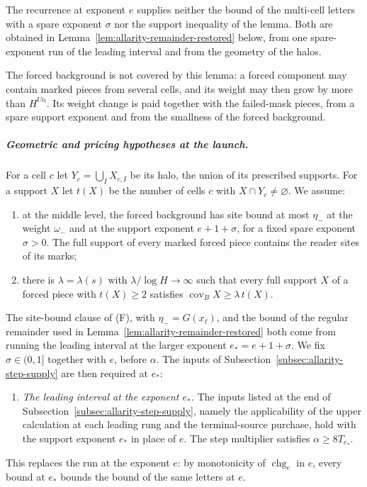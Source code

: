 The recurrence at exponent $e$ supplies neither the bound of the
multi-cell letters with a spare exponent $\sigma$ nor the support
inequality of the lemma. Both are obtained in
Lemma~\ref{lem:allarity-remainder-restored} below, from one spare-exponent
run of the leading interval and from the geometry of the halos.

The forced background is not covered by this lemma: a forced component
may contain marked pieces from several cells, and its weight may then
grow by more than $H^{Un}$. Its weight change is paid together with the
failed-mask pieces, from a spare support exponent and from the smallness
of the forced background.

\subparagraph{Geometric and pricing hypotheses at the launch.}
For a cell $c$ let $Y_c=\bigcup_IX_{c,I}$ be its halo, the union of its
prescribed supports. For a support $X$ let $t(X)$ be the number of cells
$c$ with $X\cap Y_c\ne\varnothing$. We assume:
\begin{enumerate}
\item[(F)] at the middle level, the forced background has site bound at
 most $\eta_-$ at the weight $\omega_-$ and at the support exponent
 $e+1+\sigma$, for a fixed spare exponent $\sigma>0$. The full support of
 every marked forced piece contains the reader sites of its marks;
\item[(S)] there is $\lambda=\lambda(s)$ with $\lambda/\log H\to\infty$
 such that every full support $X$ of a forced piece with
 $t(X)\ge2$ satisfies $\operatorname{cov}_BX\ge\lambda\,t(X)$.
\end{enumerate}
The site-bound clause of (F), with $\eta_-=G(x_\ell)$, and the bound of
the regular remainder used in Lemma~\ref{lem:allarity-remainder-restored}
both come from running the leading interval at the larger exponent
$e_*=e+1+\sigma$. We fix $\sigma\in(0,1]$ together with $e$, before
$\alpha$. The inputs of Subsection~\ref{subsec:allarity-step-supply} are
then required at $e_*$:
\begin{enumerate}
\item[(E)] \emph{The leading interval at the exponent $e_*$.} The inputs
 listed at the end of Subsection~\ref{subsec:allarity-step-supply}, namely
 the applicability of the upper calculation at each leading rung and the
 terminal-source purchase, hold with the support exponent $e_*$ in place
 of $e$. The step multiplier satisfies $\alpha\ge8T_{e_*}$.
\end{enumerate}
This replaces the run at the exponent $e$: by monotonicity of
$\operatorname{chg}_e$ in $e$, every bound at $e_*$ bounds the bound of the
same letters at $e$.

